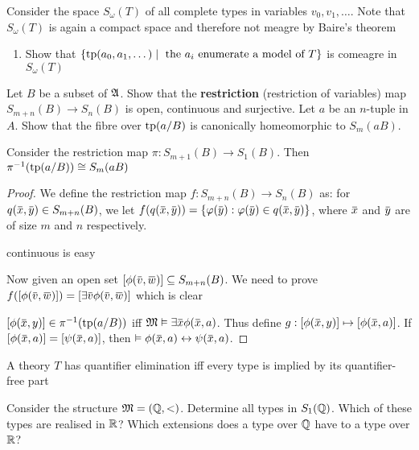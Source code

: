 \documentclass[11pt]{article}
\begin{document}
\begin{exercise}
\label{ex4.2.3}
Consider the space \(S_\omega(T)\) of all complete types in variables
\(v_0,v_1,\dots\). Note that \(S_\omega(T)\) is again a compact space and
therefore not meagre by Baire's theorem
\begin{enumerate}
\item Show that
\(\{\operatorname{tp}(a_0,a_1,\dots)\mid\text{ the $a_i$ enumerate a model of }T\}\)
 is comeagre in \(S_\omega(T)\)
\end{enumerate}
\end{exercise}

\begin{exercise}
\label{ex4.2.5}
Let \(B\) be a subset of \(\mathfrak{A}\). Show that the \textbf{restriction} (restriction of variables)
map \(S_{m+n}(B)\to S_n(B)\) is open, continuous and surjective. Let \(a\) be an \(n\)-tuple
in \(A\). Show that the fibre over \(\operatorname{tp}(a/B)\) is canonically homeomorphic to \(S_m(aB)\).

Consider the restriction map \(\pi:S_{m+1}(B)\to S_1(B)\). Then \(\pi^{-1}(\operatorname{tp}(a/B))\cong S_m(aB)\)
\end{exercise}

\begin{proof}
We define the restriction map \(f:S_{m+n}(B)\to S_n(B)\) as: for \(q(\barx,\bary)\in S_{m+n}(B)\), we
let \(f(q(\barx,\bary))=\{\varphi(\bary):\varphi(\bary)\in q(\barx,\bary)\}\), where \(\barx\) and \(\bary\) are
of size \(m\) and \(n\) respectively.

continuous is easy

Now given an open set \([\phi(\barv,\barw)]\subseteq S_{m+n}(B)\). We need to
prove \(f([\phi(\barv,\barw)])=[\exists\barv\phi(\barv,\barw)]\) which is clear

\([\phi(\barx,y)]\in\pi^{-1}(\tp(a/B))\) iff \(\fM\vDash\exists\barx\phi(\barx,a)\). Thus
define \(g:[\phi(\barx,y)]\mapsto[\phi(\barx,a)]\). If \([\phi(\barx,a)]=[\psi(\barx,a)]\), then \(\vDash\phi(\barx,a)\leftrightarrow\psi(\barx,a)\).
\end{proof}

\begin{exercise}
\label{ex4.2.6}
A theory \(T\) has quantifier elimination iff every type is implied by its quantifier-free part
\end{exercise}

\begin{exercise}
\label{ex4.2.7}
Consider the structure \(\mathfrak{M}=(\mathbb{Q},<)\). Determine all types in \(S_1(\mathbb{Q})\). Which of these types are
realised in \(\mathbb{R}\)? Which extensions does a type over \(\mathbb{Q}\) have to a type over \(\mathbb{R}\)?
\end{exercise}
\end{document}
